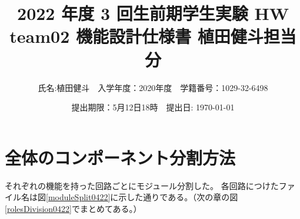 \documentclass[a4j,titlepage]{jarticle}
\begin{document}
\title{2022 年度 3 回生前期学生実験 HW  \\ \bf team02 機能設計仕様書 植田健斗担当分}
\author{氏名:植田健斗　入学年度：2020年度　学籍番号：1029-32-6498}
\date{提出期限：5月12日18時　提出日: \today} %
\maketitle
\newpage


\section{全体のコンポーネント分割方法}

それぞれの機能を持った回路ごとにモジュール分割した。
各回路につけたファイル名は図\ref{moduleSplit0422}に示した通りである。（次の章の図\ref{rolesDivision0422}でまとめてある。）
\end{document}
